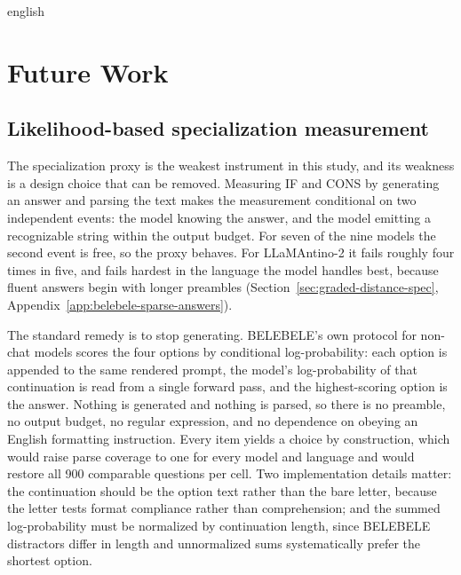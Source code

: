 \begin{otherlanguage*}{english}
\section{Future Work}
\label{sec:future-work}

\subsection{Likelihood-based specialization measurement}
\label{sec:future-belebele-likelihood}

The specialization proxy is the weakest instrument in this study, and its weakness is a design choice that can be removed. Measuring IF and CONS by generating an answer and parsing the text makes the measurement conditional on two independent events: the model knowing the answer, and the model emitting a recognizable string within the output budget. For seven of the nine models the second event is free, so the proxy behaves. For LLaMAntino-2 it fails roughly four times in five, and fails hardest in the language the model handles best, because fluent answers begin with longer preambles (Section~\ref{sec:graded-distance-spec}, Appendix~\ref{app:belebele-sparse-answers}).

The standard remedy is to stop generating. BELEBELE's own protocol for non-chat models scores the four options by conditional log-probability: each option is appended to the same rendered prompt, the model's log-probability of that continuation is read from a single forward pass, and the highest-scoring option is the answer. Nothing is generated and nothing is parsed, so there is no preamble, no output budget, no regular expression, and no dependence on obeying an English formatting instruction. Every item yields a choice by construction, which would raise parse coverage to one for every model and language and would restore all 900 comparable questions per cell. Two implementation details matter: the continuation should be the option text rather than the bare letter, because the letter tests format compliance rather than comprehension; and the summed log-probability must be normalized by continuation length, since BELEBELE distractors differ in length and unnormalized sums systematically prefer the shortest option.


\end{otherlanguage*}
